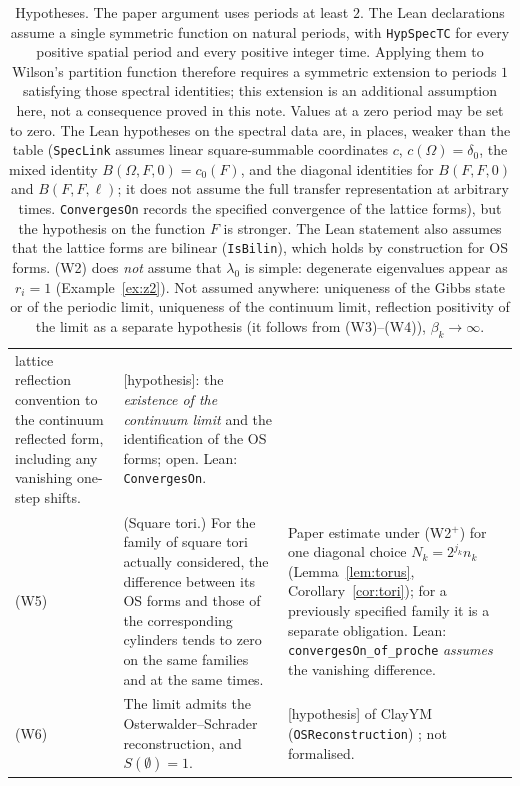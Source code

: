 \documentclass[11pt,a4paper]{article}
\theoremstyle{plain}
\theoremstyle{definition}
\theoremstyle{remark}
\numberwithin{equation}{section}
\newcommand{\st}[1]{\textsf{[#1]}}
\begin{document}
\begin{table}[ht]
\begin{tabular}{@{}>{\raggedright\arraybackslash}p{}>{\raggedright\arraybackslash}p{}%
>{\raggedright\arraybackslash}p{}@{}}
lattice reflection convention to the continuum reflected form, including any vanishing one-step shifts. & \st{hypothesis}: the
\emph{existence of the continuum limit} and the identification of the OS forms; open. Lean: \texttt{ConvergesOn}.\\
(W5) & (Square tori.) For the family of square tori actually considered, the difference between its OS forms and those of the corresponding
cylinders tends to zero on the same families and at the same times. & Paper estimate under (W2$^+$) for one diagonal choice
$N_k=2^{j_k}n_k$ (Lemma~\ref{lem:torus}, Corollary~\ref{cor:tori}); for a previously specified family it is a separate obligation. Lean:
\texttt{convergesOn\_of\_proche} \emph{assumes} the vanishing difference.\\
(W6) & The limit admits the Osterwalder--Schrader reconstruction, and $S(\emptyset)=1$. & \st{hypothesis} of ClayYM
(\texttt{OSReconstruction}) \cite{OS73,OS75,ClayYM}; not formalised.\\
\bottomrule
\end{tabular}
\caption{Hypotheses. The paper argument uses periods at least $2$. The Lean declarations assume a single symmetric function on natural periods, with \texttt{HypSpecTC} for every positive spatial period and every positive integer time. Applying them to Wilson's partition function therefore requires a symmetric extension to periods $1$ satisfying those spectral identities; this extension is an additional assumption here, not a consequence proved in this note. Values at a zero period may be set to zero. The Lean hypotheses on the spectral data are, in places, weaker than the table (\texttt{SpecLink} assumes linear square-summable coordinates $c$, $c(\Omega)=\delta_0$, the mixed identity $B(\Omega,F,0)=c_0(F)$, and the diagonal identities for $B(F,F,0)$ and $B(F,F,\ell)$; it does not assume the full transfer representation at arbitrary times. \texttt{ConvergesOn} records the specified convergence of the lattice forms), but the hypothesis on the function $F$ is stronger. The Lean
statement also assumes that the lattice forms are bilinear (\texttt{IsBilin}), which holds by construction for OS forms. (W2) does
\emph{not} assume that $\lambda_0$ is simple: degenerate eigenvalues appear as $r_i=1$ (Example~\ref{ex:z2}). Not assumed anywhere: uniqueness of the Gibbs state or of the periodic limit, uniqueness of the continuum limit, reflection positivity of
the limit as a separate hypothesis (it follows from (W3)--(W4)), $\beta_k\to\infty$.}
\label{tab:hyp}
\end{table}
\end{document}
